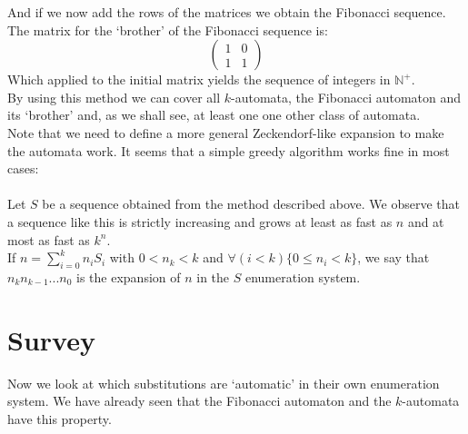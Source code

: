 \documentclass{article}
\begin{document}
And if we now add the rows of the matrices we obtain the Fibonacci sequence.
The matrix for the `brother' of the Fibonacci sequence is:
\begin{displaymath} \left( \begin{array}{cc}
1 & 0\\
1 & 1
\end{array} \right) \end{displaymath}
Which applied to the initial matrix yields the sequence of integers in $\mathbb{N}^+$.\\
By using this method we can cover all $k$-automata, the Fibonacci automaton and
its `brother' and, as we shall see, at least one one other class of automata.
\\
Note that we need to define a more general Zeckendorf-like expansion to make
the automata work. It seems that a simple greedy algorithm works fine in most
cases:\\
\\
Let $S$ be a sequence obtained from the method described above. We observe
that a sequence like this is strictly increasing and grows at least as fast
as $n$ and at most as fast as $k^n$.\\
If $n = \sum_{i = 0}^k n_i S_i$ with $0 < n_k < k$ and 
$\forall (i < k) \{0 \le n_i < k\}$, we say that 
$n_k n_{k - 1} ... n_0$ is the expansion of $n$ in the $S$ enumeration system.

\section*{Survey}
Now we look at which substitutions are `automatic' in their own enumeration
system. We have already seen that the Fibonacci automaton and the $k$-automata
have this property.
\end{document}
